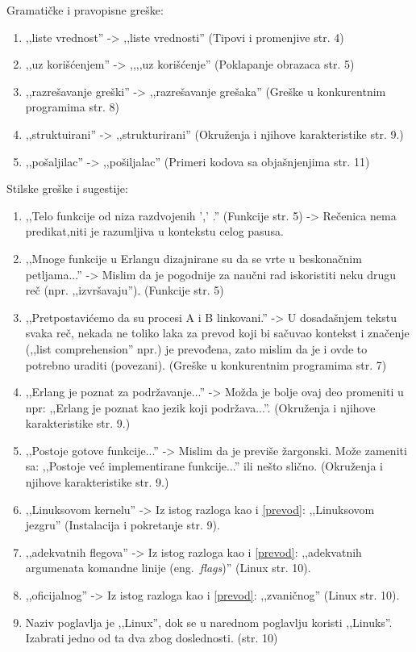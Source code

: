 \documentclass[a4paper]{report}
\begin{document}
Gramatičke i pravopisne greške:
\begin{enumerate}
\item ,,liste vrednost'' -> ,,liste vrednosti'' (Tipovi i promenjive str. 4)
\item ,,uz korišćenjem'' -> ,,,,uz korišćenje'' (Poklapanje obrazaca str. 5)
\item ,,razrešavanje greški'' -> ,,razrešavanje grešaka'' (Greške u konkurentnim programima str. 8)
\item ,,struktuirani'' -> ,,strukturirani'' (Okruženja i njihove karakteristike str. 9.)
\item ,,pošaljilac'' -> ,,pošiljalac'' (Primeri kodova sa objašnjenjima str. 11)
\end{enumerate}
Stilske greške i sugestije:
\begin{enumerate}
\item ,,Telo funkcije od niza razdvojenih ',' .'' (Funkcije str. 5) -> Rečenica nema predikat,niti je razumljiva u kontekstu celog pasusa.
\item ,,Mnoge funkcije u Erlangu dizajnirane su da se vrte u beskonačnim petljama...'' -> Mislim da je pogodnije za naučni rad iskoristiti neku drugu reč (npr. ,,izvršavaju''). (Funkcije str. 5)
\item \label{prevod} ,,Pretpostavićemo da su procesi A i B linkovani.'' -> U dosadašnjem tekstu svaka reč, nekada ne toliko laka za prevod koji bi sačuvao kontekst i značenje (,,list comprehension'' npr.) je prevođena, zato mislim da je i ovde to potrebno uraditi (povezani). (Greške u konkurentnim programima str. 7)
\item ,,Erlang je poznat za podržavanje...'' -> Možda je bolje ovaj deo promeniti u npr: ,,Erlang je poznat kao jezik koji podržava...''. (Okruženja i njihove karakteristike str. 9.)
\item ,,Postoje gotove funkcije...'' -> Mislim da je previše žargonski. Može zameniti sa: ,,Postoje već implementirane funkcije...'' ili nešto slično. (Okruženja i njihove karakteristike str. 9.)
\item ,,Linuksovom kernelu'' -> Iz istog razloga kao i \ref{prevod}: ,,Linuksovom jezgru'' (Instalacija i pokretanje str. 9).
\item ,,adekvatnih flegova'' -> Iz istog razloga kao i \ref{prevod}: ,,adekvatnih argumenata komandne linije (eng.~{\em flags})'' (Linux str. 10).
\item ,,oficijalnog'' -> Iz istog razloga kao i \ref{prevod}: ,,zvaničnog'' (Linux str. 10).
\item Naziv poglavlja je ,,Linux'', dok se u narednom poglavlju koristi ,,Linuks''. Izabrati jedno od ta dva zbog doslednosti. (str. 10)
\end{enumerate}
\end{document}
